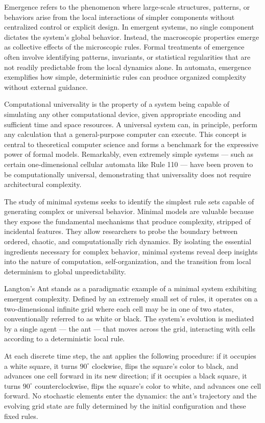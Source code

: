 Emergence refers to the phenomenon where large-scale structures, patterns, or behaviors arise from the local interactions of simpler components without centralized control or explicit design. In emergent systems, no single component dictates the system’s global behavior. Instead, the macroscopic properties emerge as collective effects of the microscopic rules. Formal treatments of emergence often involve identifying patterns, invariants, or statistical regularities that are not readily predictable from the local dynamics alone. In automata, emergence exemplifies how simple, deterministic rules can produce organized complexity without external guidance.

Computational universality is the property of a system being capable of simulating any other computational device, given appropriate encoding and sufficient time and space resources. A universal system can, in principle, perform any calculation that a general-purpose computer can execute. This concept is central to theoretical computer science and forms a benchmark for the expressive power of formal models. Remarkably, even extremely simple systems — such as certain one-dimensional cellular automata like Rule 110 — have been proven to be computationally universal, demonstrating that universality does not require architectural complexity.

The study of minimal systems seeks to identify the simplest rule sets capable of generating complex or universal behavior. Minimal models are valuable because they expose the fundamental mechanisms that produce complexity, stripped of incidental features. They allow researchers to probe the boundary between ordered, chaotic, and computationally rich dynamics. By isolating the essential ingredients necessary for complex behavior, minimal systems reveal deep insights into the nature of computation, self-organization, and the transition from local determinism to global unpredictability.

Langton's Ant stands as a paradigmatic example of a minimal system exhibiting emergent complexity. Defined by an extremely small set of rules, it operates on a two-dimensional infinite grid where each cell may be in one of two states, conventionally referred to as white or black. The system's evolution is mediated by a single agent — the ant — that moves across the grid, interacting with cells according to a deterministic local rule.

At each discrete time step, the ant applies the following procedure: if it occupies a white square, it turns $90^\circ$ clockwise, flips the square's color to black, and advances one cell forward in its new direction; if it occupies a black square, it turns $90^\circ$ counterclockwise, flips the square's color to white, and advances one cell forward. No stochastic elements enter the dynamics: the ant’s trajectory and the evolving grid state are fully determined by the initial configuration and these fixed rules.

